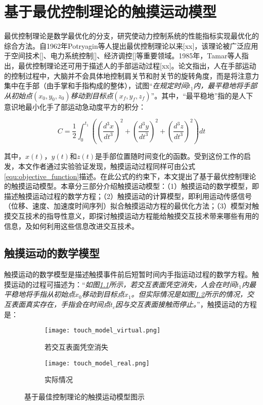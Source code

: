 
\chapter{基于最优控制理论的触摸运动模型}

最优控制理论是数学最优化的分支，研究使动力控制系统的性能指标实现最优化的综合方法。自1962年Potryagin等人提出最优控制理论以来[xx]，该理论被广泛应用于空间技术[]、电力系统控制[]、经济调控[]等重要领域。1985年，Tamar等人指出，最优控制理论还可用于描述人的手部运动过程[xx]。论文指出，人在手部运动的控制过程中，大脑并不会具体地控制肩关节和肘关节的旋转角度，而是将注意力集中在手部（由手掌和手指构成的整体），试图“\emph{在规定时间$t_1$内，最平稳地将手部从初始点$(x_0, y_0, z_0)$移动到目标点$(x_f, y_f, z_f)$}”。其中，“最平稳地”指的是人下意识地最小化手了部运动急动度平方的积分：

\begin{equation}
	C=\frac{1}{2}\int_{0}^{t_1}\left(\left(\frac{d^3x}{dt^3}\right)^2+\left(\frac{d^3y}{dt^3}\right)^2+\left(\frac{d^3z}{dt^3}\right)^2\right)dt
	\label{equ:objective_function}
\end{equation}

其中，$x(t)$，$y(t)$和$z(t)$是手部位置随时间变化的函数。受到这份工作的启发，本文作者通过实验验证发现，触摸运动过程同样可由公式\ref{equ:objective_function}描述。在此公式的约束下，本文提出了基于最优控制理论的触摸运动模型。本章分三部分介绍触摸运动模型：（1）触摸运动的数学模型，即描述触摸运动过程的数学方程；（2）触摸运动的计算模型，即利用运动传感信号（位移、速度、加速度时间序列）拟合触摸运动方程的最优化方法；（3）模型对触摸交互技术的指导性意义，即探讨触摸运动方程能给触摸交互技术带来哪些有用的信息，及如何利用这些信息改进交互技术。

\section{触摸运动的数学模型}

触摸运动的数学模型是描述触摸事件前后短暂时间内手指运动过程的数学方程。触摸运动的过程可描述为：“\emph{如图\ref{fig:touch_model_virtual}所示，若交互表面凭空消失，人会在时间$t_1$内最平稳地将手指从初始点$x_0$移动到目标点$x_1$。但实际情况是如图\ref{fig:touch_model_real}所示的情况，交互表面真实存在，手指会在时间点$t_c$因与交互表面接触而停止。}”，触摸运动的方程是：

\begin{figure}
	\centering
	\begin{subfigure}[b]{0.45\textwidth}
		\texttt{[image: touch\_model\_virtual.png]}
		\caption{若交互表面凭空消失}
		\label{fig:touch_model_virtual}
	\end{subfigure}\hfill%
	\begin{subfigure}[b]{0.45\textwidth}
		\texttt{[image: touch\_model\_real.png]}
		\caption{实际情况}
		\label{fig:touch_model_real}
	\end{subfigure}
	\caption{基于最佳控制理论的触摸运动模型图示}
	\label{fig:touch_model}
\end{figure}

